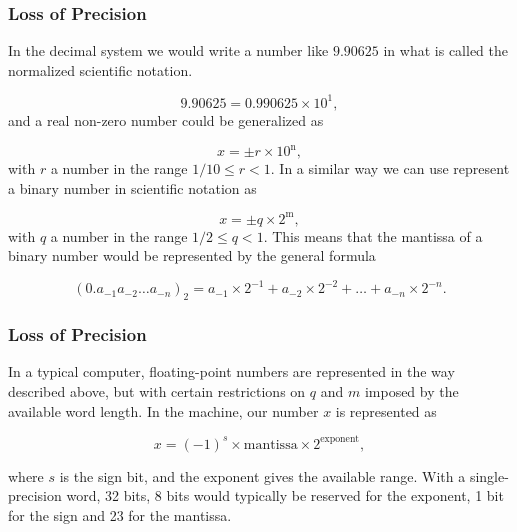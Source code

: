 \documentclass[handout]{beamer}
\newenvironment{block_mdfboxadmon}[1][]{\begin{block}{#1}}{\end{block}}
\begin{document}
\begin{frame}
\frametitle{Loss of Precision}

\begin{block_mdfboxadmon}
In the decimal system we would write a number like $9.90625$
in what is called the normalized scientific notation.

\[
  9.90625=0.990625\times 10^{1},
\]
and a real non-zero number could be generalized as

\begin{equation}
    x=\pm r\times 10^{{\mbox{n}}},
\end{equation}
with $r$ a number in the range $1/10 \le r < 1$.
In a similar way we can use represent a binary number in
scientific notation as

\begin{equation}
    x=\pm q\times 2^{{\mbox{m}}},
\end{equation}
with $q$ a number in the range $1/2 \le q < 1$.
This means that the mantissa of a binary number would be represented by
the general formula

\begin{equation}
(0.a_{-1}a_{-2}\dots a_{-n})_2=a_{-1}\times 2^{-1}
+a_{-2}\times 2^{-2}+\dots+a_{-n}\times 2^{-n}.
\end{equation}
\end{block_mdfboxadmon}
\end{frame}

\begin{frame}
\frametitle{Loss of Precision}

\begin{block_mdfboxadmon}
In a typical computer, floating-point numbers are represented
in the way described above, but with certain restrictions
on $q$ and $m$ imposed by the available word length.
In the machine, our
number $x$ is represented as

\begin{equation}
    x=(-1)^s\times {\mbox{mantissa}}\times 2^{{\mbox{exponent}}},
\end{equation}

where $s$ is the sign bit, and the exponent gives the available range.
With a single-precision word, 32 bits, 8 bits would typically be reserved
for the exponent,  1 bit for the sign and 23 for the mantissa.
\end{block_mdfboxadmon}
\end{frame}
\end{document}
